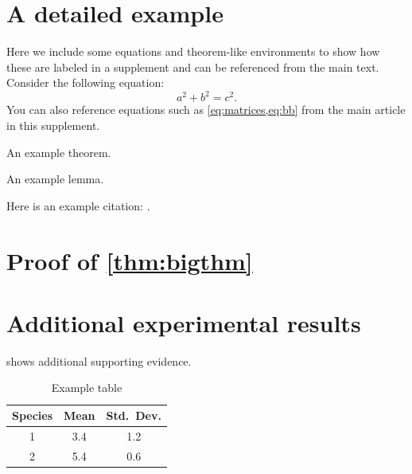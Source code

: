 \documentclass[review,supplement,onefignum,onetabnum]{siamart190516}
\begin{document}
\maketitle

\section{A detailed example}

Here we include some equations and theorem-like environments to show
how these are labeled in a supplement and can be referenced from the
main text.
Consider the following equation:
\begin{equation}
  \label{eq:suppa}
  a^2 + b^2 = c^2.
\end{equation}
You can also reference equations such as \cref{eq:matrices,eq:bb}
from the main article in this supplement.

\lipsum[100-101]

\begin{theorem}
  An example theorem.
\end{theorem}

\lipsum[102]

\begin{lemma}
  An example lemma.
\end{lemma}

\lipsum[103-105]

Here is an example citation: \cite{KoMa14}.

\section[Proof of Thm]{Proof of \cref{thm:bigthm}}
\label{sec:proof}

\lipsum[106-112]

\section{Additional experimental results}
 shows additional
supporting evidence.

\begin{table}[htbp]
{\footnotesize
  \caption{Example table}  \label{tab:foo}
\begin{center}
  \begin{tabular}{|c|c|c|} \hline
   Species & \bf Mean & \bf Std.~Dev. \\ \hline
    1 & 3.4 & 1.2 \\
    2 & 5.4 & 0.6 \\ \hline
  \end{tabular}
\end{center}
}
\end{table}




\end{document}
